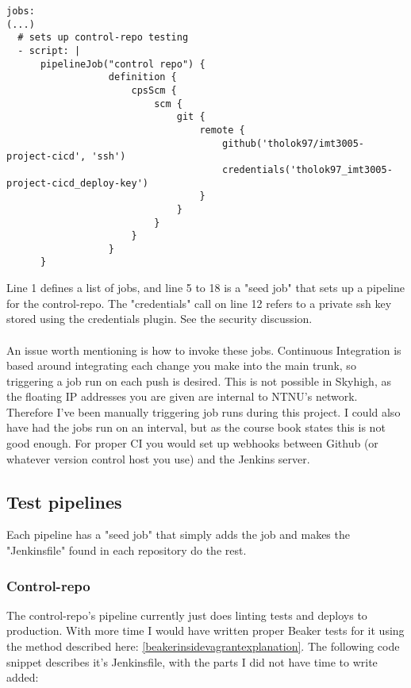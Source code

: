 \begin{verbatim}
jobs:
(...)
  # sets up control-repo testing
  - script: |
      pipelineJob("control repo") {
                  definition {
                      cpsScm {
                          scm {
                              git {
                                  remote {
                                      github('tholok97/imt3005-project-cicd', 'ssh')
                                      credentials('tholok97_imt3005-project-cicd_deploy-key')
                                  }
                              }
                          }
                      }
                  }
      }
\end{verbatim}

Line 1 defines a list of jobs, and line 5 to 18 is a "seed job" that sets up a pipeline for the control-repo. The "credentials" call on line 12 refers to a private ssh key stored using the credentials plugin. See the security discussion.
\\
\\
An issue worth mentioning is how to invoke these jobs. Continuous Integration is based around integrating each change you make into the main trunk, so triggering a job run on each push is desired. This is not possible in Skyhigh, as the floating IP addresses you are given are internal to NTNU's network. Therefore I've been manually triggering job runs during this project. I could also have had the jobs run on an interval, but as the course book\cite{coursebook} states this is not good enough. For proper CI you would set up webhooks between Github (or whatever version control host you use) and the Jenkins server.

\subsection{Test pipelines}

Each pipeline has a "seed job" that simply adds the job and makes the "Jenkinsfile" found in each repository do the rest. 

\subsubsection{Control-repo}

The control-repo's pipeline currently just does linting tests and deploys to production. With more time I would have written proper Beaker tests for it using the method described here: \ref{beakerinsidevagrantexplanation}. The following code snippet describes it's Jenkinsfile, with the parts I did not have time to write added:

